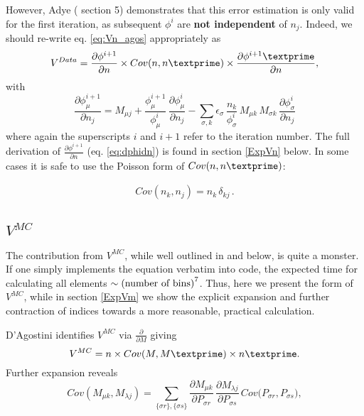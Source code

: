 However, Adye (\cite{adye} section 5) demonstrates that this error estimation is only valid for the first iteration, as subsequent $\phi^{i}$ are \textbf{not independent} of $n_{j}$. 
Indeed, we should re-write eq. \ref{eq:Vn_agos} appropriately as
\begin{equation} \label{eq:Vn_matrix}
	V^{Data} = 
	\frac{\partial \phi^{i+1}}{\partial n} \times
	Cov(n,n\textprime) \times
	\frac{\partial \phi^{i+1}\textprime}{\partial n} ,
\end{equation}
with 
\begin{equation*}
	\frac{\partial \phi^{i+1}_{\mu}}{\partial n_{j}}
	= M_{\mu j} + \frac{\phi^{i+1}_{\mu}}{\phi^{i}_{\mu}} \, \frac{\partial \phi^{i}_{\mu}}{\partial n_{j}}
	- \sum_{\sigma, k}{ \epsilon_{\sigma} \, \frac{n_{k}}{\phi^{i}_{\sigma}} \, M_{\mu k} \, M_{\sigma k} \, \frac{\partial \phi^{i}_{\sigma}}{\partial n_{j}}}
\end{equation*}
where again the superscripts $i$ and $i+1$ refer to the iteration number.
The full derivation of $\frac{\partial \phi^{i+1}}{\partial n}$ (eq. \ref{eq:dphidn}) is found in section \ref{ExpVn} below.
In some cases it is safe to use the Poisson form of $Cov(n,n\textprime)$:

\begin{equation}
 \begin{split}
Cov(n_{k},n_{j}) = n_{k} \, \delta_{kj} \,.
 \end{split}
\end{equation}

\subsection{$V^{MC}$}
The contribution from $V^{MC}$, while well outlined in \cite{agostini} and below, is quite a monster. If one simply implements the equation verbatim 
into code, the expected time for calculating all elements $\sim \textnormal{(number of bins)}^{7}$. Thus, here we present the form of $V^{MC}$, 
while in section \ref{ExpVm} we show the explicit expansion and further contraction of indices towards a more reasonable, practical calculation.

D'Agostini identifies $V^{MC}$ via $\frac{\partial}{\partial M}$ giving
\begin{equation} \label{eq:Vmc_dagos}
	V^{MC} = 
	n\times Cov(M,M\textprime) \times n\textprime.
\end{equation}
Further expansion reveals 
\begin{equation} \label{eq:CovMM}
	Cov(M_{\mu k},M_{\lambda j}) = 
	\sum_{\{\sigma r\},\{\sigma s\}} 
	\frac{\partial M_{\mu k}}{\partial P_{\sigma r}}
  \,
	\frac{\partial M_{\lambda j}}{\partial P_{\sigma s}} 
  \,
	Cov \big( P_{\sigma r}, P_{\sigma s} \big),
\end{equation}

